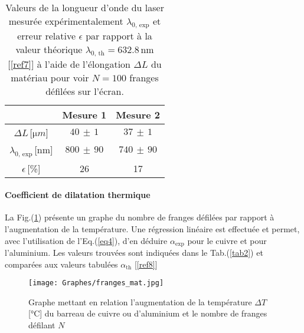 \documentclass[a4paper, 12pt,oneside]{article}
\begin{document}
\begin{table}[H]
    \centering
    \begin{minipage}{0.35\textwidth}  %
        \centering
        \begin{tabular}{|c||c|c|}
        \hline
        & Mesure 1 & Mesure 2\\
        \hline
        $\Delta L\,$[$\mathrm{\mu}m$] & $40\,\pm\,1$ & $37\,\pm\,1$  \\
        \hline
        $\lambda_{0,\,\text{exp}}\,$[nm]  & $800\,\pm\,90$ & $740\,\pm\,90$\\
        \hline
        $\epsilon\,$[\%] & 26 & 17\\
        \hline
        \end{tabular}
    \end{minipage}%
    \hfill
    \begin{minipage}{0.6\textwidth}  %
        \captionsetup{justification=centering}  %
        \caption{Valeurs de la longueur d’onde du laser mesurée expérimentalement $\lambda_{0,\,\text{exp}}$ et erreur relative $\epsilon$ par rapport à la valeur théorique $\lambda_{0,\,\text{th}} = 632.8\,$nm [\ref{ref7}] à l'aide de l'élongation $\Delta L$ du matériau pour voir $N=100$ franges défilées sur l'écran.}
        \label{tab1}
    \end{minipage}
\end{table}

\paragraph{Coefficient de dilatation thermique}

La Fig.(\ref{fig3}) présente un graphe du nombre de franges défilées par rapport à l'augmentation de la température. Une régression linéaire est effectuée et permet, avec l'utilisation de l'Eq.(\ref{eq4}), d'en déduire $\alpha_{\text{exp}}$ pour le cuivre et pour l'aluminium. Les valeurs trouvées sont indiquées dans le Tab.(\ref{tab2}) et comparées aux valeurs tabulées $\alpha _{\text{th}}$ [\ref{ref8}]

\begin{figure}[h]
    \centering
    \texttt{[image: Graphes/franges\_mat.jpg]}
    \captionsetup{justification=centering}
    \caption{Graphe mettant en relation l'augmentation de la température $\Delta T$[°C] du barreau de cuivre ou d'aluminium et le nombre de franges défilant $N$}
    \label{fig3}
\end{figure}
\end{document}
